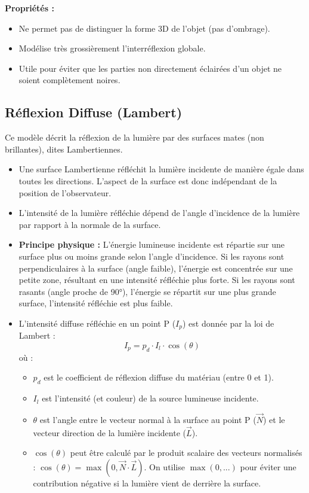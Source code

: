 \textbf{Propriétés :}
\begin{itemize}
    \item Ne permet pas de distinguer la forme 3D de l'objet (pas d'ombrage).
    \item Modélise très grossièrement l'interréflexion globale.
    \item Utile pour éviter que les parties non directement éclairées d'un objet ne soient complètement noires.
\end{itemize}
\subsection{Réflexion Diffuse (Lambert)}
Ce modèle décrit la réflexion de la lumière par des surfaces mates (non brillantes), dites Lambertiennes.
\begin{itemize}
    \item Une surface Lambertienne réfléchit la lumière incidente de manière égale dans toutes les directions. L'aspect de la surface est donc indépendant de la position de l'observateur.
    \item L'intensité de la lumière réfléchie dépend de l'angle d'incidence de la lumière par rapport à la normale de la surface.
    \item \textbf{Principe physique :} L'énergie lumineuse incidente est répartie sur une surface plus ou moins grande selon l'angle d'incidence. Si les rayons sont perpendiculaires à la surface (angle faible), l'énergie est concentrée sur une petite zone, résultant en une intensité réfléchie plus forte. Si les rayons sont rasants (angle proche de 90°), l'énergie se répartit sur une plus grande surface, l'intensité réfléchie est plus faible.
    \item L'intensité diffuse réfléchie en un point P (\(I_p\)) est donnée par la loi de Lambert :
    \[ I_p = p_d \cdot I_l \cdot \cos(\theta) \]
    où :
        \begin{itemize}
            \item \(p_d\) est le coefficient de réflexion diffuse du matériau (entre 0 et 1).
            \item \(I_l\) est l'intensité (et couleur) de la source lumineuse incidente.
            \item \(\theta\) est l'angle entre le vecteur normal à la surface au point P (\(\vec{N}\)) et le vecteur direction de la lumière incidente (\(\vec{L}\)).
            \item \(\cos(\theta)\) peut être calculé par le produit scalaire des vecteurs normalisés : \(\cos(\theta) = \max(0, \vec{N} \cdot \vec{L})\). On utilise \(\max(0, ...)\) pour éviter une contribution négative si la lumière vient de derrière la surface.
        \end{itemize}
\end{itemize}
